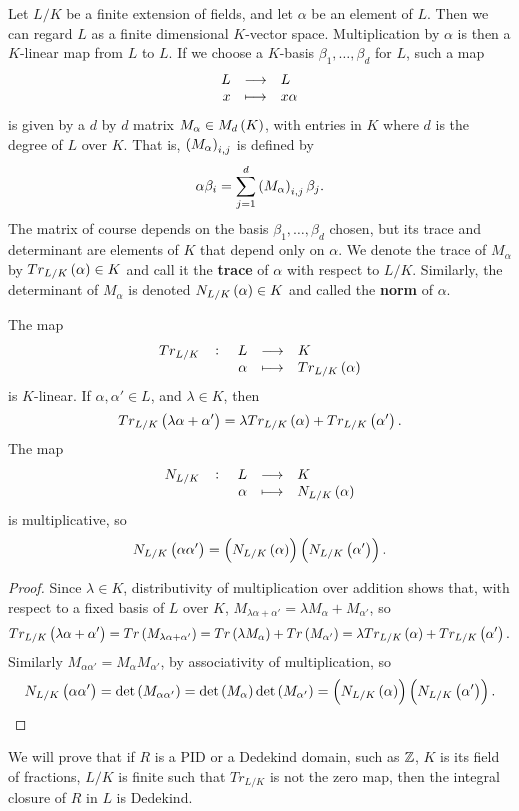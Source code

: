 Let $ L / K $ be a finite extension of fields, and let $ \alpha $ be an element of $ L $. Then we can regard $ L $ as a finite dimensional $ K $-vector space. Multiplication by $ \alpha $ is then a $ K $-linear map from $ L $ to $ L $. If we choose a $ K $-basis $ \beta_1, \dots, \beta_d $ for $ L $, such a map
$$ \function{L}{L}{x}{x\alpha} $$
is given by a $ d $ by $ d $ matrix $ M_\alpha \in M_d\br{K} $, with entries in $ K $ where $ d $ is the degree of $ L $ over $ K $. That is, $ \br{M_\alpha}_{i, j} $ is defined by
$$ \alpha\beta_i = \sum_{j = 1}^d \br{M_\alpha}_{i, j}\beta_j. $$
The matrix of course depends on the basis $ \beta_1, \dots, \beta_d $ chosen, but its trace and determinant are elements of $ K $ that depend only on $ \alpha $. We denote the trace of $ M_\alpha $ by $ Tr_{L / K}\br{\alpha} \in K $ and call it the \textbf{trace} of $ \alpha $ with respect to $ L / K $. Similarly, the determinant of $ M_\alpha $ is denoted $ N_{L / K}\br{\alpha} \in K $ and called the \textbf{norm} of $ \alpha $.

\begin{lemma}
The map
$$ \function[Tr_{L / K}]{L}{K}{\alpha}{Tr_{L / K}\br{\alpha}} $$
is $ K $-linear. If $ \alpha, \alpha' \in L $, and $ \lambda \in K $, then
$$ Tr_{L / K}\br{\lambda\alpha + \alpha'} = \lambda Tr_{L / K}\br{\alpha} + Tr_{L / K}\br{\alpha'}. $$
The map
$$ \function[N_{L / K}]{L}{K}{\alpha}{N_{L / K}\br{\alpha}} $$
is multiplicative, so
$$ N_{L / K}\br{\alpha\alpha'} = \br{N_{L / K}\br{\alpha}}\br{N_{L / K}\br{\alpha'}}. $$
\end{lemma}

\begin{proof}
Since $ \lambda \in K $, distributivity of multiplication over addition shows that, with respect to a fixed basis of $ L $ over $ K $, $ M_{\lambda\alpha + \alpha'} = \lambda M_\alpha + M_{\alpha'} $, so
$$ Tr_{L / K}\br{\lambda\alpha + \alpha'} = Tr\br{M_{\lambda\alpha + \alpha'}} = Tr\br{\lambda M_\alpha} + Tr\br{M_{\alpha'}} = \lambda Tr_{L / K}\br{\alpha} + Tr_{L / K}\br{\alpha'}. $$
Similarly $ M_{\alpha\alpha'} = M_\alpha M_{\alpha'} $, by associativity of multiplication, so
$$ N_{L / K}\br{\alpha\alpha'} = \det\br{M_{\alpha\alpha'}} = \det\br{M_\alpha}\det\br{M_{\alpha'}} = \br{N_{L / K}\br{\alpha}}\br{N_{L / K}\br{\alpha'}}. $$
\end{proof}

We will prove that if $ R $ is a PID or a Dedekind domain, such as $ \mathbb{Z} $, $ K $ is its field of fractions, $ L / K $ is finite such that $ Tr_{L / K} $ is not the zero map, then the integral closure of $ R $ in $ L $ is Dedekind.

